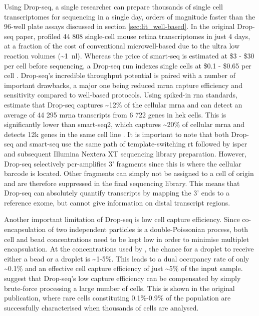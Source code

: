 Using Drop-seq, a single researcher can prepare thousands of single cell transcriptomes for sequencing in a single day, orders of magnitude faster than the 96-well plate assays discussed in section \ref{sec:lit_well-based}. In the original Drop-seq paper, \citeauthor{macosko2015} profiled 44 808 single-cell mouse retina transcriptomes in just 4 days, at a fraction of the cost of conventional microwell-based due to the ultra low reaction volumes (\textasciitilde{}\SI{1}{\nano\litre}). Whereas the price of \acrshort{smart-seq} is estimated at \$3 - \$30 per cell before sequencing, a Drop-seq run indexes single cells at \$0.1 - \$0.65 per cell \citep{macosko2015, ziegenhain2017}. Drop-seq's incredible throughput potential is paired with a number of important drawbacks, a major one being reduced \acrshort{mrna} capture efficiency and sensitivity compared to well-based protocols. Using spiked-in \acrshort{rna} standards, \citeauthor{macosko2015} estimate that Drop-seq captures \textasciitilde{}12\% of the cellular \acrshort{mrna} and can detect an average of 44 295 \acrshort{mrna} transcripts from 6 722 genes in \acrshort{hek} cells. This is significantly lower than \acrshort{smart-seq}2, which captures \textasciitilde{}20\% of cellular \acrshort{mrna} and detects 12k genes in the same cell line \citep{picelli2013}. It is important to note that both Drop-seq and \acrshort{smart-seq} use the same path of template-switching \acrshort{rt} followed by \acrshort{ispcr} and subsequent Illumina Nextera XT sequencing library preparation. However, Drop-seq selectively \acrshort{pcr}-amplifies 3' fragments since this is where the cellular barcode is located. Other fragments can simply not be assigned to a cell of origin and are therefore suppressed in the final sequencing library. This means that Drop-seq can absolutely quantify transcripts by mapping the 3' ends to a reference exome, but cannot give information on distal transcript regions.\pms

Another important limitation of Drop-seq is low cell capture efficiency. Since co-encapsulation of two independent particles is a double-Poissonian process, both cell and bead concentrations need to be kept low in order to minimise multiplet encapsulation. At the concentrations used by \citeauthor{macosko2015}, the chance for a droplet to receive either a bead or a droplet is \textasciitilde{}1-5\%. This leads to a dual occupancy rate of only \textasciitilde{}0.1\% and an effective cell capture efficiency of just \textasciitilde{}5\% of the input sample. \citeauthor{macosko2015} suggest that Drop-seq's low capture efficiency can be compensated by simply brute-force processing a large number of cells. This is shown in the original publication, where rare cells constituting 0.1\%-0.9\% of the population are successfully characterised when thousands of cells are analysed.\pms

